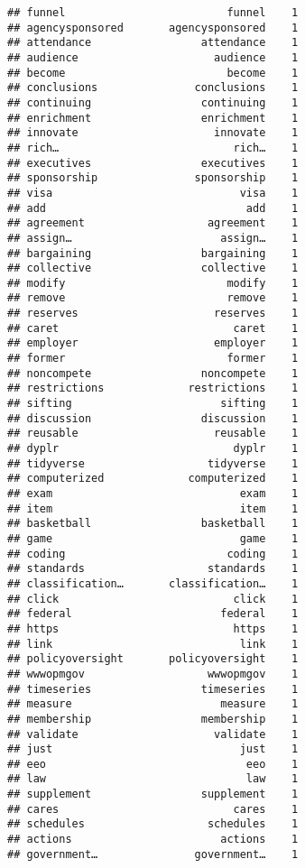\documentclass[]{article}
\begin{document}
\begin{verbatim}
## funnel                         funnel    1
## agencysponsored       agencysponsored    1
## attendance                 attendance    1
## audience                     audience    1
## become                         become    1
## conclusions               conclusions    1
## continuing                 continuing    1
## enrichment                 enrichment    1
## innovate                     innovate    1
## rich…                           rich…    1
## executives                 executives    1
## sponsorship               sponsorship    1
## visa                             visa    1
## add                               add    1
## agreement                   agreement    1
## assign…                       assign…    1
## bargaining                 bargaining    1
## collective                 collective    1
## modify                         modify    1
## remove                         remove    1
## reserves                     reserves    1
## caret                           caret    1
## employer                     employer    1
## former                         former    1
## noncompete                 noncompete    1
## restrictions             restrictions    1
## sifting                       sifting    1
## discussion                 discussion    1
## reusable                     reusable    1
## dyplr                           dyplr    1
## tidyverse                   tidyverse    1
## computerized             computerized    1
## exam                             exam    1
## item                             item    1
## basketball                 basketball    1
## game                             game    1
## coding                         coding    1
## standards                   standards    1
## classification…       classification…    1
## click                           click    1
## federal                       federal    1
## https                           https    1
## link                             link    1
## policyoversight       policyoversight    1
## wwwopmgov                   wwwopmgov    1
## timeseries                 timeseries    1
## measure                       measure    1
## membership                 membership    1
## validate                     validate    1
## just                             just    1
## eeo                               eeo    1
## law                               law    1
## supplement                 supplement    1
## cares                           cares    1
## schedules                   schedules    1
## actions                       actions    1
## government…               government…    1

\end{verbatim}
\end{document}
